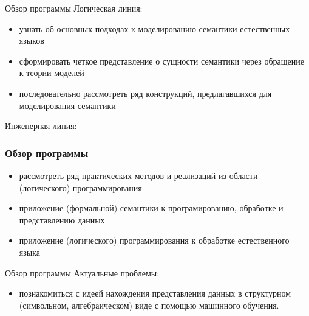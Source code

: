\documentclass{beamer}
\begin{document}
\begin{frame}{Обзор программы}
Логическая линия:\bigskip
\begin{itemize}
  \item узнать об основных подходах к моделированию семантики естественных языков
  \item сформировать четкое представление о сущности семантики через обращение к теории моделей
  \item последовательно рассмотреть ряд конструкций, предлагавшихся для моделирования семантики
\end{itemize}
\end{frame}

\begin{frame}[fragile]
Инженерная линия:\bigskip
\frametitle{Обзор программы}
\begin{itemize}
  \item рассмотреть ряд практических методов и реализаций из области (логического) программирования
  \item приложение (формальной) семантики к програмированию, обработке и представлению данных
  \item приложение (логического) программирования к обработке естественного языка
\end{itemize}
\end{frame}

\begin{frame}{Обзор программы}
Актуальные проблемы:\bigskip 
\begin{itemize}
  \item познакомиться с идеей нахождения представления данных в структурном (символьном, алгебраическом) виде с помощью машинного обучения.
\end{itemize}
\end{frame}
\end{document}
